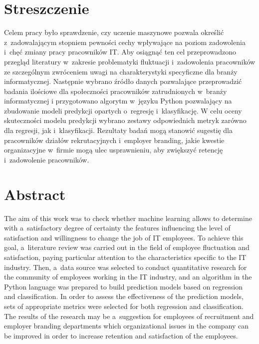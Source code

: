 \chapter*{Streszczenie} %
Celem pracy było sprawdzenie, czy uczenie maszynowe pozwala określić z~zadowalającym stopniem
pewności cechy wpływające na poziom zadowolenia i~chęć zmiany pracy pracowników IT.
Aby osiągnąć ten cel przeprowadzono przegląd literatury w~zakresie problematyki fluktuacji i~zadowolenia pracowników
ze szczególnym zwróceniem uwagi na charakterystyki specyficzne dla branży informatycznej.
Następnie wybrano źródło danych pozwalające przeprowadzić badania ilościowe dla społeczności pracowników zatrudnionych w~branży informatycznej
i przygotowano algorytm w~języku Python pozwalający na zbudowanie modeli predykcji opartych o~regresję i~klasyfikację.
W celu oceny skuteczności modelu predykcji wybrano zestawy odpowiednich metryk zarówno dla regresji, jak i~klasyfikacji.
Rezultaty badań mogą stanowić sugestię dla pracowników działów rekrutacyjnych i~employer branding,
jakie kwestie organizacyjne w~firmie mogą ulec usprawnieniu, aby zwiększyć retencję i~zadowolenie pracowników.

\begingroup
\renewcommand{\cleardoublepage}{}
\renewcommand{\clearpage}{}
\chapter*{Abstract} %

The aim of this work was to check whether machine learning allows to determine with a~satisfactory degree of certainty the features influencing the level of satisfaction and willingness to change the job of IT employees.
To achieve this goal, a~literature review was carried out in the field of employee fluctuation and satisfaction, paying particular attention to the characteristics specific to the IT industry.
Then, a~data source was selected to conduct quantitative research for the community of employees working in the IT industry,
and an algorithm in the Python language was prepared to build prediction models based on regression and classification.
In order to assess the effectiveness of the prediction models, sets of appropriate metrics were selected for both regression and classification.
The results of the research may be a~suggestion for employees of recruitment and employer branding departments
which organizational issues in the company can be improved in order to increase retention and satisfaction of the employees.

\endgroup
{}
